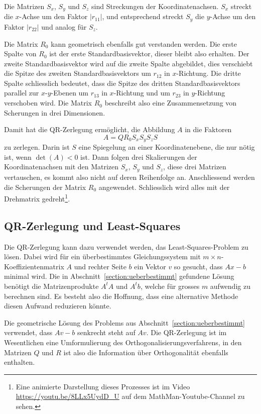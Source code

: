 Die Matrizen $S_x$, $S_y$ und $S_z$ sind Streckungen der Koordinatenachsen.
$S_x$ streckt die $x$-Achse um den Faktor $|r_{11}|$, und entsprechend 
streckt $S_y$ die $y$-Achse um den Faktor $|r_{22}|$ und analog für $S_z$.

Die Matrix $R_0$ kann geometrisch ebenfalls gut verstanden werden.
Die erste Spalte von $R_0$ ist der erste Standardbasisvektor, dieser
bleibt also erhalten.
Der zweite Standardbasisvektor wird auf die zweite Spalte abgebildet,
dies verschiebt die Spitze des zweiten Standardbasisvektors um $r_{12}$ in
$x$-Richtung.
Die dritte Spalte schliesslich bedeutet, dass die Spitze des dritten
Standardbasisvektors parallel zur $x$-$y$-Ebenen um $r_{13}$ in $x$-Richtung
und um $r_{23}$ in $y$-Richtung verschoben wird.
Die Matrix $R_0$ beschreibt also eine Zusammensetzung von Scherungen 
in drei Dimensionen.

Damit hat die QR-Zerlegung ermöglicht, die Abbildung $A$ in die Faktoren
\[
A=QR_0S_xS_yS_zS
\]
zu zerlegen.
Darin ist $S$ eine Spiegelung an einer Koordinatenebene, die nur nötig
ist, wenn $\det(A) < 0$ ist.
Dann folgen drei Skalierungen der Koordinatenachsen mit den Matrizen
$S_x$, $S_y$ und $S_z$, diese drei Matrizen vertauschen, es kommt also
nicht auf deren Reihenfolge an.
Anschliessend werden die Scherungen der Matrix $R_0$ angewendet.
Schliesslich wird alles mit der Drehmatrix gedreht\footnote{
Eine animierte Darstellung dieses Prozesses ist im Video
\url{https://youtu.be/8LLx5UydD_U} auf dem MathMan-Youtube-Channel
zu sehen.}.

%
%
\subsection{QR-Zerlegung und Least-Squares}
Die QR-Zerlegung kann dazu verwendet werden, das Least-Squares-Problem
zu lösen.
Dabei wird für ein überbestimmtes Gleichungssystem mit
$m\times n$-Koeffizienten\-matrix $A$ und rechter Seite $b$ ein Vektor $v$
so gesucht,
dass $Ax-b$ minimal wird.
Die in Abschnitt~\ref{section:ueberbestimmt}
gefundene Lösung benötigt die Matrizenprodukte $A^tA$ und $A^tb$, welche
für grosses $m$ aufwendig zu berechnen sind.
Es besteht also die Hoffnung,
dass eine alternative Methode diesen Aufwand reduzieren könnte.

Die geometrische Lösung des Problems aus Abschnitt~\ref{section:ueberbestimmt}
verwendet, dass $Av-b$ senkrecht steht auf $Av$.
Die QR-Zerlegung ist
im Wesentlichen eine Umformulierung des Orthogonalisierungsverfahrens, in den
Matrizen $Q$ und $R$ ist also die Information über Orthogonalität ebenfalls
enthalten.


